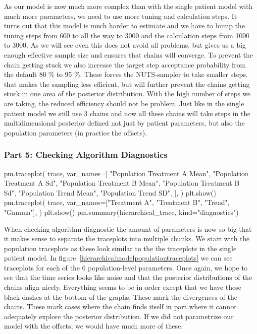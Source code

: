 \documentclass[12pt,a4paper,leqno]{report}
\theoremstyle{plain}
\theoremstyle{definition}
\theoremstyle{remark}
\begin{document}
As our model is now much more complex than with the single patient model with much
more parameters, we need to use more tuning and calculation steps. It turns out that this model is
much harder to estimate and we have to bump the tuning steps from 600 to all the way to
3000 and the calculation steps from 1000 to 3000. As we will see even this does not
avoid all problems, but gives us a big enough effective sample size and ensures that
chains will converge. To prevent the chain getting stuck we also increase the target
step acceptance probability  from the default 80 \% to 95 \%.
These forces the NUTS-sampler to take smaller steps, that makes the sampling less
efficient, but will further prevent the chains getting stuck in one area of the
posterior distribution. With the high number of steps we are taking, the reduced
efficiency should not be problem. Just like in the single patient model we still use 3
chains and now all these chains will take steps in the multidimensional posterior defined not
just by patient parameters, but also the population parameters (in practice the offsets).

\subsubsection*{Part 5: Checking Algorithm Diagnostics}

\bigskip
\begin{pyverbatim}[][fontsize=\footnotesize]
    pm.traceplot(
        trace,
        var_names=[
            "Population Treatment A Mean",
            "Population Treatment A Sd",
            "Population Treatment B Mean",
            "Population Treatment B Sd",
            "Population Trend Mean",
            "Population Trend SD",
        ],
    )
    plt.show()
    pm.traceplot(
        trace,
        var_names=["Treatment A", "Treatment B", "Trend", "Gamma"],
    )
    plt.show()
    pm.summary(hierarchical_trace, kind="diagnostics")
\end{pyverbatim}
\bigskip

When checking algorithm diagnostic the amount of parameters is now so big that it makes
sense to separate the traceplots into multiple chunks. We start with the population
traceplots as these look similar to the the traceplots in the single patient
model. In figure\ \ref{hierarchicalmodelpopulationtraceplots} we can see traceplots for each of
the 6 population-level parameters. Once again, we hope to see that the time series looks
like noise and that the posterior distributions of the chains align nicely. Everything
seems to be in order except that we have these black dashes at the bottom of the graphs.
These mark the divergences of the chains. These mark cases where the chain finds itself
in part where it cannot adequately explore the posterior distribution. If we did not
parametrize our model with the offsets, we would have much more of these.
\end{document}
